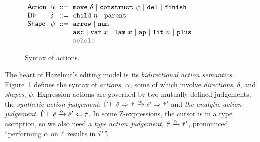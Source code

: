 \begin{figure}%
\hspace{-3px}$\arraycolsep=3pt\begin{array}{llcllll}
\mathsf{Action} & \alpha & ::= &
  \aMove{\delta} ~\vert~
  \aConstruct{\psi} ~\vert~
  \aDel ~\vert~
  \aFinish\\
\mathsf{Dir} & \delta & ::= &
  \dChildnm{n} ~\vert~
  \dParent\\
\mathsf{Shape} & \psi & ::= &
  \farr ~\vert~
  \fnum \\
& & \vert &
  \fasc ~\vert~
  \fvar{x} ~\vert~
  \flam{x} ~\vert~
  \fap ~\vert~
  \fnumlit{n} ~\vert~
  \fplus\\
& & \vert &
  {\color{gray}\fnehole}
\end{array}$
\caption{Syntax of actions.}
\label{fig:action-syntax}
\end{figure}
The heart of Hazelnut's editing model is its \emph{bidirectional action
  semantics}.  Figure~\ref{fig:action-syntax} defines the syntax of
\emph{actions}, $\alpha$, some of which involve \emph{directions},
$\delta$, and \emph{shapes}, $\psi$. Expression actions are governed by two mutually defined judgements, the
\emph{synthetic action judgement}:
$\dot{\Gamma} \vdash \hat{e} \Rightarrow \dot{\tau} \xrightarrow{\alpha} \hat{e}' \Rightarrow \dot{\tau}'$
and \emph{the analytic action judgement}, 
$\dot{\Gamma} \vdash \hat{e} \xrightarrow{\alpha} \hat{e}' \Leftarrow \dot{\tau}$. 
In some Z-expressions, the cursor is in a type ascription, so we also need
a \emph{type action judgement}, $\hat{\tau} \xrightarrow{\alpha} \hat{\tau}'$, pronounced ``performing $\alpha$ on $\hat{\tau}$
results in $\hat{\tau}'$''.

